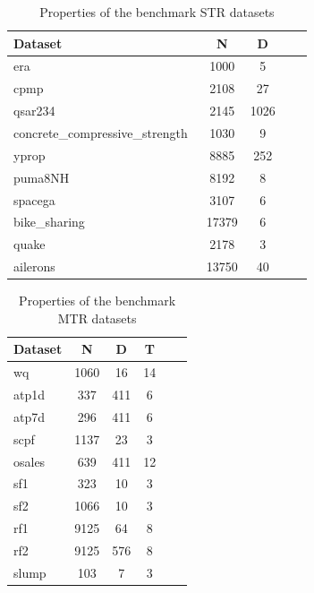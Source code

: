\documentclass[3p,review,authoryear]{elsarticle}
\begin{document}
\begin{table}[h!]
\centering
\caption{Properties of the benchmark STR datasets}
\label{tab:str}
\begin{tabular}{@{}lcccc@{}}
\toprule
\textbf{Dataset}   & \textbf{N} & \textbf{D} \\ \midrule
era~\citep{openml}                  & 1000         & 5          \\
cpmp~\citep{openml}                     & 2108         & 27          \\
qsar234~\citep{openml}                   & 2145         & 1026             \\
concrete\_compressive\_strength~\citep{openml}                   & 1030         & 9          \\
yprop~\citep{openml}                   & 8885         & 252       \\
puma8NH~\citep{openml}                & 8192         & 8        \\
spacega~\citep{openml}                  & 3107         & 6             \\
bike\_sharing~\citep{openml}           & 17379         & 6            \\
quake~\citep{openml}       & 2178         & 3         \\
ailerons~\citep{openml}         & 13750         & 40           \\ \bottomrule
\end{tabular}
\end{table}

\begin{table}[h!]
\centering
\caption{Properties of the benchmark MTR datasets}
\label{tab:mtr}
\begin{tabular}{@{}lccccc@{}}
\toprule
\textbf{Dataset}   & \textbf{N} & \textbf{D} & \textbf{T}     \\ \midrule
wq~\citep{openml}                  & 1060         & 16         & 14 \\
atp1d~\citep{openml}               &       337         & 411   &  6     \\
atp7d~\citep{openml}                   & 296         & 411       &  6    \\
scpf~\citep{openml}                   & 1137         & 23       &  3  \\
osales~\citep{openml}                   & 639         & 411   &  12  \\
sf1~\citep{openml}             &  323        & 10       &  3   \\
sf2~\citep{openml}                & 1066         & 10     & 3  \\
rf1~\citep{openml}                  & 9125         & 64       &  8    \\
rf2~\citep{openml}           &  9125        & 576       &  8   \\
slump~\citep{openml}       & 103         & 7   &  3    \\ \bottomrule
\end{tabular}
\end{table}
\end{document}

